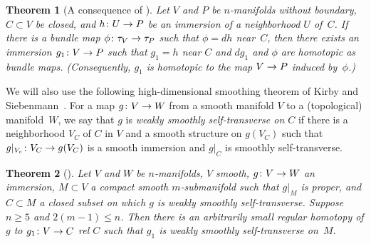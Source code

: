 \documentclass[11pt]{amsart}
\def\to{\mathchoice{\longrightarrow}{\rightarrow}{\rightarrow}{\rightarrow}}
\newtheorem{theorem}{Theorem}[section]
\theoremstyle{definition}
\theoremstyle{theorem-giventitle}
\theoremstyle{definition-giventitle}
\numberwithin{equation}{section}
\begin{document}
\begin{theorem}[{A consequence of \cite[Immersion Theorem, p.~189]{Lashof:1971-1}}]
  \label{theorem:top-immersion}
  Let $V$ and $P$ be $n$-manifolds without boundary, $C\subset V$ be closed, and $h\colon U\to P$ be an immersion of a neighborhood $U$ of~$C$.
  If there is a bundle map $\phi\colon \tau_V \to \tau_P$ such that $\phi=dh$ near~$C$, then there exists an immersion $g_1\colon V\to P$ such that $g_1=h$ near $C$ and $dg_1$ and $\phi$ are homotopic as bundle maps.
  (Consequently, $g_1$ is homotopic to the map $V\to P$ induced by~$\phi$.)
\end{theorem}

We will also use the following high-dimensional smoothing theorem of Kirby and Siebenmann~\cite{Kirby-Siebenmann:1977-1}.
For a map $g\colon V\to W$ from a smooth manifold $V$ to a (topological) manifold~$W$, we say that $g$ is \emph{weakly smoothly self-transverse on $C$} if there is a neighborhood $V_C$ of $C$ in $V$ and a smooth structure on $g(V_C)$ such that $g|_{V_c}\colon V_C\to g(V_C)$ is a smooth immersion and $g|_C$ is smoothly self-transverse.

\begin{theorem}[{\cite[Essay III, C.6]{Kirby-Siebenmann:1977-1}}]
  \label{theorem:ks-smoothing}
  Let $V$ and $W$ be $n$-manifolds, $V$ smooth, $g\colon V\to W$ an immersion, $M\subset V$ a compact smooth $m$-submanifold such that $g|_M$ is proper, and $C\subset M$ a closed subset on which $g$ is weakly smoothly self-transverse.
  Suppose $n\ge 5$ and $2(m-1) \le n$.
  Then there is an arbitrarily small regular homotopy of $g$ to $g_1\colon V\to C$ rel $C$ such that $g_1$ is weakly smoothly self-transverse on~$M$.
\end{theorem}
\end{document}
